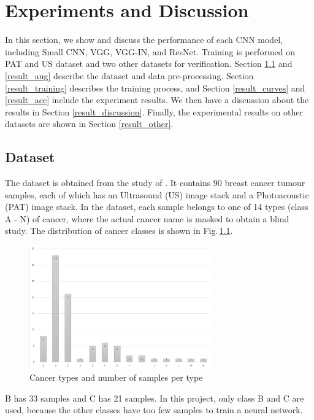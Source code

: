 \chapter{Experiments and Discussion} 
\label{experiments}
In this section, we show and discuss the performance of each CNN model, including Small CNN, VGG, VGG-IN, and ResNet. Training is performed on PAT and US dataset and two other datasets for verification. Section \ref{result_dataset} and \ref{result_aug} describe the dataset and data pre-processing. Section \ref{result_training} describes the training process, and Section \ref{result_curves} and \ref{result_acc} include the experiment results. We then have a discussion about the results in Section \ref{result_discussion}. Finally, the experimental results on other datasets are shown in Section \ref{result_other}.
\section{Dataset}
\label{result_dataset}
The dataset is obtained from the study of \cite{Kosik2019}. It contains 90 breast cancer tumour samples, each of which has an Ultrasound (US) image stack and a Photoacoustic (PAT) image stack. In the dataset, each sample belongs to one of 14 types (class A - N) of cancer, where the actual cancer name is masked to obtain a blind study. The distribution of cancer classes is shown in Fig.\,\ref{class_graph}.  
\begin{figure}[h]
	\centering
	\includegraphics[width=0.7\textwidth]{Figs/class_graph.png}
    \caption{Cancer types and number of samples per type}
    \label{class_graph}
\end{figure}

B has 33 samples and C has 21 samples. In this project, only class B and C are used, because the other classes have too few samples to train a neural network.

